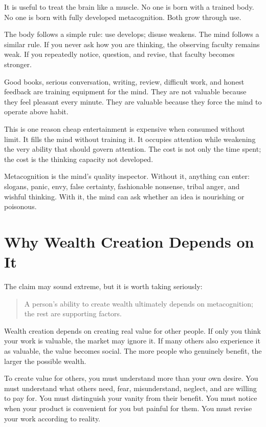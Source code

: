 It is useful to treat the brain like a muscle. No one is born with a trained body. No one is born with fully developed metacognition. Both grow through use.

The body follows a simple rule: use develops; disuse weakens. The mind follows a similar rule. If you never ask how you are thinking, the observing faculty remains weak. If you repeatedly notice, question, and revise, that faculty becomes stronger.

Good books, serious conversation, writing, review, difficult work, and honest feedback are training equipment for the mind. They are not valuable because they feel pleasant every minute. They are valuable because they force the mind to operate above habit.

This is one reason cheap entertainment is expensive when consumed without limit. It fills the mind without training it. It occupies attention while weakening the very ability that should govern attention. The cost is not only the time spent; the cost is the thinking capacity not developed.

Metacognition is the mind's quality inspector. Without it, anything can enter: slogans, panic, envy, false certainty, fashionable nonsense, tribal anger, and wishful thinking. With it, the mind can ask whether an idea is nourishing or poisonous.

\section*{Why Wealth Creation Depends on It}

The claim may sound extreme, but it is worth taking seriously:

\begin{quote}
A person's ability to create wealth ultimately depends on metacognition; the rest are supporting factors.
\end{quote}

Wealth creation depends on creating real value for other people. If only you think your work is valuable, the market may ignore it. If many others also experience it as valuable, the value becomes social. The more people who genuinely benefit, the larger the possible wealth.

To create value for others, you must understand more than your own desire. You must understand what others need, fear, misunderstand, neglect, and are willing to pay for. You must distinguish your vanity from their benefit. You must notice when your product is convenient for you but painful for them. You must revise your work according to reality.

